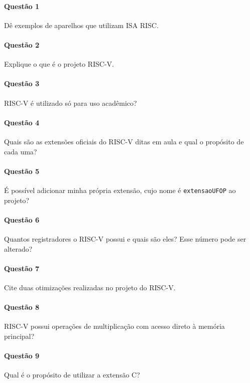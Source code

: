 \documentclass[a4paper,12pt,fleqn]{article}
\begin{document}
\vspace{0.3cm}


\paragraph{Questão 1} Dê exemplos de aparelhos que utilizam ISA RISC.

\paragraph{Questão 2} Explique o que é o projeto RISC-V.

\paragraph{Questão 3} RISC-V é utilizado só para uso acadêmico?

\paragraph{Questão 4} Quais são as extensões oficiais do RISC-V ditas em aula e qual o propósito de cada uma?

\paragraph{Questão 5} É possível adicionar minha própria extensão, cujo nome é \texttt{extensaoUFOP} ao projeto?

\paragraph{Questão 6} Quantos registradores o RISC-V possui e quais são eles? Esse número pode ser alterado?

\paragraph{Questão 7} Cite duas otimizações realizadas no projeto do RISC-V.

\paragraph{Questão 8} RISC-V possui operações de multiplicação com acesso direto à memória principal?

\paragraph{Questão 9} Qual é o propósito de utilizar a extensão C?
\end{document}
